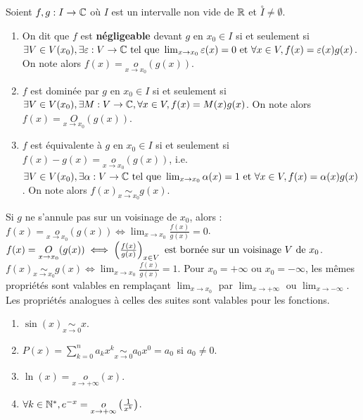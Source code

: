 \documentclass[12pt, a4paper]{report}
\begin{document}
\begin{definition}
    Soient $f,g : I \to \mathbb{C}$ où $I$ est un intervalle non vide de $\mathbb{R}$ et $\overset{\circ}{I} \ne \emptyset$.
    \begin{enumerate}
        \item On dit que $f$ est \textbf{négligeable} devant $g$ en $x_0 \in I$ si et seulement si $\exists V \in V(x_0), \exists \varepsilon : V \to \mathbb{C} \text{ tel que } \lim_{x\to x_0} \varepsilon(x) = 0 \text{ et } \forall x \in V, f(x) = \varepsilon(x) g(x)$. On note alors $f(x)= \underset{x\to x_0}{o}(g(x))$.
        \item $f$ est dominée par $g$ en $x_0 \in I$ si et seulement si $\exists V \in V(x_0), \exists M:V\to\mathbb{C}, \forall x \in V, f(x) = M(x) g(x)$. On note alors $f(x)= \underset{x\to x_0}{O}(g(x))$.
        \item $f$ est équivalente à $g$ en $x_0 \in I$ si et seulement si $f(x)-g(x)=\underset{x\to x_0}{o}(g(x))$, i.e. $\exists V \in V(x_0), \exists \alpha : V \to \mathbb{C} \text{ tel que } \lim_{x\to x_0} \alpha(x) = 1 \text{ et } \forall x \in V, f(x) = \alpha(x) g(x)$. On note alors $f(x) \underset{x\to x_0}{\sim} g(x)$.
    \end{enumerate}
\end{definition}

\begin{remark}
    \begin{outline}
        \1 Si $g$ ne s'annule pas sur un voisinage de $x_0$, alors :
        \2 $f(x) = \underset{x\to x_0}{o}(g(x)) \iff \lim_{x\to x_0} \frac{f(x)}{g(x)} = 0$.
        \2 $f(x) = \underset{x\to x_0}{O}(g(x)) \iff \left(\frac{f(x)}{g(x)}\right)_{x\in V} \text{ est bornée sur un voisinage } V \text{ de } x_0$.
        \2 $f(x) \underset{x\to x_0}{\sim} g(x) \iff \lim_{x\to x_0} \frac{f(x)}{g(x)} = 1$.
        \1 Pour $x_0 = +\infty$ ou $x_0 = -\infty$, les mêmes propriétés sont valables en remplaçant $\lim_{x\to x_0}$ par $\lim_{x\to +\infty}$ ou $\lim_{x\to -\infty}$.
        \1 Les propriétés analogues à celles des suites sont valables pour les fonctions.
    \end{outline}
\end{remark}

\begin{example}
    \begin{enumerate}
        \item $\sin(x) \underset{x\to 0}{\sim} x$.
        \item $P(x)=\sum_{k=0}^n a_k x^k \underset{x\to 0}{\sim} a_0x^0=a_0$ si $a_0 \neq 0$.
        \item $\ln(x)= \underset{x\to +\infty}{o}(x)$.
        \item $\forall k \in \mathbb{N}^*, e^{-x} = \underset{x\to +\infty}{o}\left(\frac{1}{x^k}\right)$.
    \end{enumerate}
\end{example}
\end{document}
